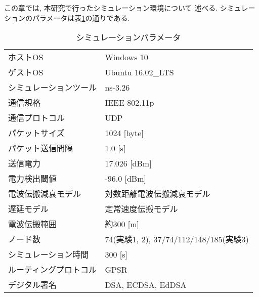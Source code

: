 この章では, 本研究で行ったシミュレーション環境について
述べる. シミュレーションのパラメータは表\ref{tab:simulation_parameter}の通りである.
\setlength{\tabcolsep}{30pt}
\begin{longtable}{ll}
  \caption{シミュレーションパラメータ}
  \label{tab:simulation_parameter}
  \endfirsthead
  \hline
  ホストOS & Windows 10\\
  ゲストOS & Ubuntu 16.02\_LTS\\
  シミュレーションツール & ns-3.26 \\
  通信規格 & IEEE 802.11p \\
  通信プロトコル & UDP \\
  パケットサイズ & 1024 [byte] \\
  パケット送信間隔 & 1.0 [s] \\
  送信電力 & 17.026 [dBm] \\
  電力検出閾値 & -96.0 [dBm] \\
  電波伝搬減衰モデル & 対数距離電波伝搬減衰モデル \\
  遅延モデル & 定常速度伝搬モデル \\
  電波伝搬範囲 & 約300 [m] \\
  ノード数 & 74(実験1, 2), 37/74/112/148/185(実験3) \\
  シミュレーション時間 & 300 [s] \\
  ルーティングプロトコル & GPSR \\
  デジタル署名 & DSA, ECDSA, EdDSA \\ \hline
\end{longtable}
\vspace{3em}


\vspace{2em}

\vspace{2em}

\vspace{1em}

\vspace{1em}

\vspace{1em}

